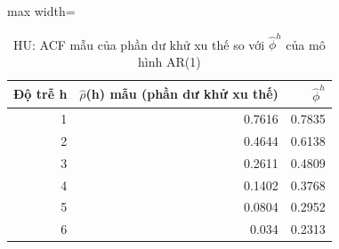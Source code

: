 \begin{table}[H]
\centering\footnotesize
\caption{HU: ACF mẫu của phần dư khử xu thế so với $\hat\phi^h$ của mô hình AR(1)}\label{tab:tab_b11_06_ar1_acf}
\begin{adjustbox}{max width=\linewidth}
\begin{tabular}{|r|r|r|}
\toprule
Độ trễ h & $\hat{\rho}$(h) mẫu (phần dư khử xu thế) & $\hat{\phi}^{h}$ \\
\midrule
1 & 0.7616 & 0.7835 \\
2 & 0.4644 & 0.6138 \\
3 & 0.2611 & 0.4809 \\
4 & 0.1402 & 0.3768 \\
5 & 0.0804 & 0.2952 \\
6 & 0.034 & 0.2313 \\
\bottomrule
\end{tabular}
\end{adjustbox}
\end{table}
